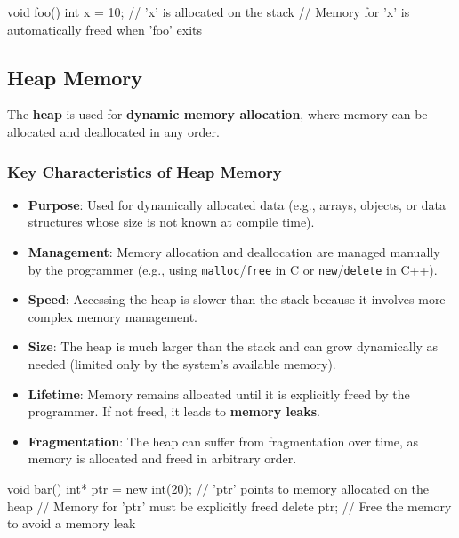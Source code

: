 \begin{exampleblock}
    \begin{codeblock}[language=C++]
void foo() {
    int x = 10; // 'x' is allocated on the stack
    // Memory for 'x' is automatically freed when 'foo' exits
}
    \end{codeblock}
\end{exampleblock}

\subsection{Heap Memory}

The \textbf{heap} is used for \textbf{dynamic memory allocation}, where memory can be allocated and deallocated in any order.

\subsubsection{Key Characteristics of Heap Memory}
\begin{itemize}
    \item \textbf{Purpose}: Used for dynamically allocated data (e.g., arrays, objects, or data structures whose size is not known at compile time).
    \item \textbf{Management}: Memory allocation and deallocation are managed manually by the programmer (e.g., using \texttt{malloc}/\texttt{free} in C or \texttt{new}/\texttt{delete} in C++).
    \item \textbf{Speed}: Accessing the heap is slower than the stack because it involves more complex memory management.
    \item \textbf{Size}: The heap is much larger than the stack and can grow dynamically as needed (limited only by the system's available memory).
    \item \textbf{Lifetime}: Memory remains allocated until it is explicitly freed by the programmer. If not freed, it leads to \textbf{memory leaks}.
    \item \textbf{Fragmentation}: The heap can suffer from fragmentation over time, as memory is allocated and freed in arbitrary order.
\end{itemize}

\begin{exampleblock}
    \begin{codeblock}[language=C++]
void bar() {
    int* ptr = new int(20); // 'ptr' points to memory allocated on the heap
    // Memory for 'ptr' must be explicitly freed
    delete ptr; // Free the memory to avoid a memory leak
}
    \end{codeblock}
\end{exampleblock}


